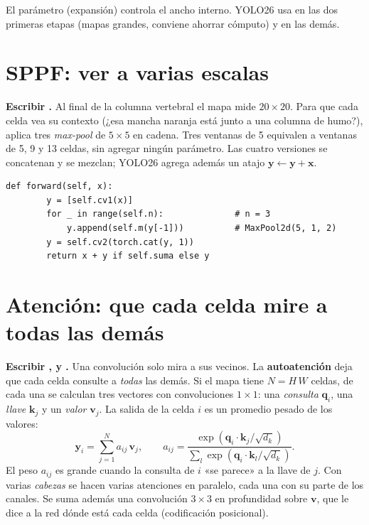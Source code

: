 \begin{consejo}
El parámetro  (expansión) controla el ancho interno. YOLO26 usa
 en las dos primeras etapas (mapas grandes, conviene ahorrar
cómputo) y  en las demás.
\end{consejo}

\section{SPPF: ver a varias escalas}

 \textbf{Escribir .}
Al final de la columna vertebral el mapa mide $20\times20$. Para que cada celda
vea su contexto (¿esa mancha naranja está junto a una columna de humo?),
 aplica tres \emph{max-pool} de $5\times5$ en cadena. Tres
ventanas de 5 equivalen a ventanas de 5, 9 y 13 celdas, sin agregar ningún
parámetro. Las cuatro versiones se concatenan y se mezclan; YOLO26 agrega
además un atajo $\mathbf{y} \leftarrow \mathbf{y} + \mathbf{x}$.

\begin{lstlisting}[style=py]
    def forward(self, x):
        y = [self.cv1(x)]
        for _ in range(self.n):              # n = 3
            y.append(self.m(y[-1]))          # MaxPool2d(5, 1, 2)
        y = self.cv2(torch.cat(y, 1))
        return x + y if self.suma else y
\end{lstlisting}

\section{Atención: que cada celda mire a todas las demás}

 \textbf{Escribir ,  y .}
Una convolución solo mira a sus vecinos. La \textbf{autoatención} deja que cada
celda consulte a \emph{todas} las demás. Si el mapa tiene $N = H\,W$ celdas, de
cada una se calculan tres vectores con convoluciones $1\times1$: una
\emph{consulta} $\mathbf{q}_i$, una \emph{llave} $\mathbf{k}_j$ y un
\emph{valor} $\mathbf{v}_j$. La salida de la celda $i$ es un promedio pesado de
los valores:
\begin{equation}
\mathbf{y}_i = \sum_{j=1}^{N} a_{ij}\,\mathbf{v}_j,\qquad
a_{ij} = \frac{\exp(\mathbf{q}_i\cdot\mathbf{k}_j/\sqrt{d_k})}
              {\sum_{l}\exp(\mathbf{q}_i\cdot\mathbf{k}_l/\sqrt{d_k})}.
\end{equation}
El peso $a_{ij}$ es grande cuando la consulta de $i$ «se parece» a la llave de
$j$. Con varias \emph{cabezas} se hacen varias atenciones en paralelo, cada una
con su parte de los canales. Se suma además una convolución $3\times3$ en
profundidad sobre $\mathbf{v}$, que le dice a la red dónde está cada celda
(codificación posicional).

